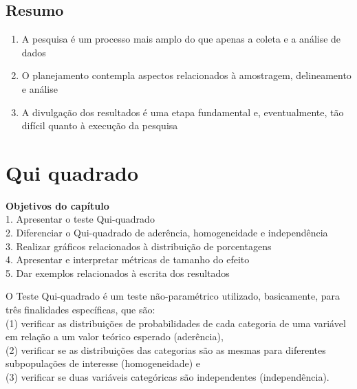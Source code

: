 \documentclass[
]{book}
\providecommand{\tightlist}{%
  \setlength{\itemsep}{0pt}\setlength{\parskip}{0pt}}
\newenvironment{objectives}{
  \definecolor{shadecolor}{rgb}{0.764,0.992,0.686}  %
  \color{black}
  \begin{shaded}}
 {\end{shaded}}
\begin{document}
\hypertarget{resumo-5}{%
\section{Resumo}\label{resumo-5}}

\begin{enumerate}
\def\labelenumi{\arabic{enumi}.}
\tightlist
\item
  A pesquisa é um processo mais amplo do que apenas a coleta e a análise de dados\\
\item
  O planejamento contempla aspectos relacionados à amostragem, delineamento e análise\\
\item
  A divulgação dos resultados é uma etapa fundamental e, eventualmente, tão difícil quanto à execução da pesquisa\\
\end{enumerate}

\hypertarget{qui-quadrado}{%
\chapter{Qui quadrado}\label{qui-quadrado}}

\begin{objectives}
\textbf{Objetivos do capítulo}\\
1. Apresentar o teste Qui-quadrado\\
2. Diferenciar o Qui-quadrado de aderência, homogeneidade e independência\\
3. Realizar gráficos relacionados à distribuição de porcentagens\\
4. Apresentar e interpretar métricas de tamanho do efeito\\
5. Dar exemplos relacionados à escrita dos resultados

\end{objectives}

O Teste Qui-quadrado é um teste não-paramétrico utilizado, basicamente, para três finalidades específicas, que são:\\
(1) verificar as distribuições de probabilidades de cada categoria de uma variável em relação a um valor teórico esperado (aderência),\\
(2) verificar se as distribuições das categorias são as mesmas para diferentes subpopulações de interesse (homogeneidade) e\\
(3) verificar se duas variáveis categóricas são independentes (independência).
\end{document}
